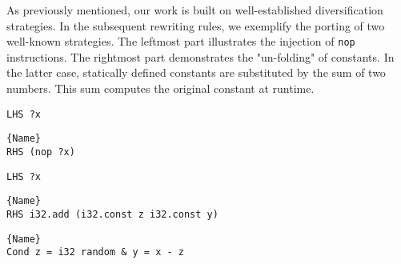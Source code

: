 As previously mentioned, our work is built on well-established diversification strategies. 
In the subsequent rewriting rules, we exemplify the porting of two well-known strategies. 
The leftmost part illustrates the injection of \texttt{nop} instructions. 
The rightmost part demonstrates the "un-folding" of constants. 
In the latter case, statically defined constants are substituted by the sum of two numbers. 
This sum computes the original constant at runtime.


\begin{minipage}{0.95\linewidth}
\begin{minipage}{0.49\linewidth}
    
    \lstset{
    language=ttt,
    style=watcode,
    basicstyle=\footnotesize\ttfamily,
    columns=fullflexible,
    breaklines=true}
    \begin{lstlisting}[]
LHS ?x
            \end{lstlisting}\vspace{-0.5cm}
    \noindent\hrulefill
        \lstset{
            language=ttt,
            style=watcode,
            basicstyle=\footnotesize\ttfamily,
            columns=fullflexible,
            breaklines=true}
            \vspace{-0.2cm}
            \begin{lstlisting}[numbers=none]{Name}
RHS (nop ?x)
    \end{lstlisting}
\end{minipage}
\begin{minipage}{0.49\linewidth}
    \lstset{
    language=ttt,
    style=watcode,
    basicstyle=\footnotesize\ttfamily,
    columns=fullflexible,
    breaklines=true}
    \begin{lstlisting}[]
LHS ?x
            \end{lstlisting}\vspace{-0.5cm}
    \noindent\hrulefill
        \lstset{
            language=ttt,
            style=watcode,
            basicstyle=\footnotesize\ttfamily,
            columns=fullflexible,
            breaklines=true}
            \vspace{-0.2cm}
            \begin{lstlisting}[numbers=none]{Name}
RHS i32.add (i32.const z i32.const y) 
    \end{lstlisting}\vspace{-0.5cm}
    \noindent\hrulefill
\lstset{
        language=ttt,
        style=watcode,
        basicstyle=\footnotesize\ttfamily,
        columns=fullflexible,
        breaklines=true}
        \begin{lstlisting}[numbers=none]{Name}
Cond z = i32 random & y = x - z 
        \end{lstlisting}
\end{minipage}    
\end{minipage}



